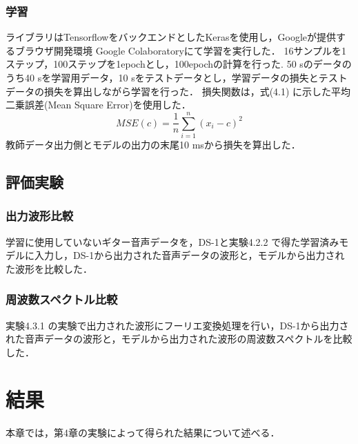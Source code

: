 \documentclass{jreport}		%
\begin{document}
\newpage
\subsection{学習}
ライブラリはTensorflowをバックエンドとしたKerasを使用し，Googleが提供するブラウザ開発環境 Google Colaboratoryにて学習を実行した．
16サンプルを1ステップ，100ステップを1epochとし，100epochの計算を行った.
50 sのデータのうち40 sを学習用データ，10 sをテストデータとし，学習データの損失とテストデータの損失を算出しながら学習を行った．
損失関数は，式(4.1) に示した平均二乗誤差(Mean Square Error)を使用した．
\begin{equation}
  MSE(c) = \frac{1}{n}\sum_{i=1}^{n}(x_i-c)^2
\end{equation}
教師データ出力側とモデルの出力の末尾10 msから損失を算出した．

\section{評価実験}
\subsection{出力波形比較}
学習に使用していないギター音声データを，DS-1と実験4.2.2 で得た学習済みモデルに入力し，DS-1から出力された音声データの波形と，モデルから出力された波形を比較した．

\subsection{周波数スペクトル比較}
実験4.3.1 の実験で出力された波形にフーリエ変換処理を行い，DS-1から出力された音声データの波形と，モデルから出力された波形の周波数スペクトルを比較した．

\chapter{結果}
本章では，第4章の実験によって得られた結果について述べる．
\end{document}
